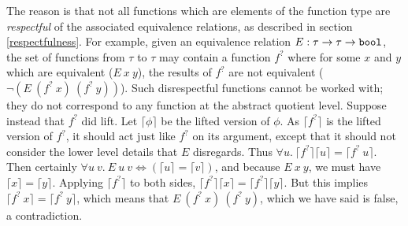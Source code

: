 \documentclass[envcountsame,runningheads]{llncs}
\begin{document}
The reason is that not all functions which are elements of the function
type are {\it respectful\/} of the associated equivalence relations,
as described in
section {\ref{respectfulness}}.
For example, given an equivalence relation
$E:\tau \rightarrow \tau \rightarrow \mbox{\tt bool}$,
the set of functions from $\tau$ to $\tau$ may contain a function
$f^?$ where for some $x$ and $y$
which are equivalent
($E\ x\ y$), the results of $f^?$ are not equivalent
($\neg (E\ (f^?\ x)\ (f^?\ y))$).
Such disrespectful functions cannot be worked with; they do not
correspond to any function at the abstract quotient level.
%
Suppose instead that $f^?$ did lift.
Let $\lceil \phi \rceil$ be the lifted version of $\phi$.
As $\lceil f^? \rceil$ is the lifted version of $f^?$,
it should act just like $f^?$ on its argument,
except that it should not consider the lower level details
that $E$
disregards.
Thus
$
\forall u.\
\lceil f^? \rceil \lceil u \rceil =
\lceil f^?\ u \rceil $.
Then
certainly
$\forall u\ v.\ E\ u\ v \Leftrightarrow (\lceil u \rceil = \lceil v \rceil)$,
and
because $E\ x\ y$, we must have $\lceil x \rceil = \lceil y \rceil$.
Applying $\lceil f^? \rceil$ to both sides,
$\lceil f^? \rceil \lceil x \rceil = \lceil f^? \rceil \lceil y \rceil$.
But this implies $\lceil f^?\ x \rceil = \lceil f^?\ y \rceil$,
which means that $E\ (f^?\ x)\ (f^?\ y)$, which we have said is false,
a contradiction.
%
\end{document}
